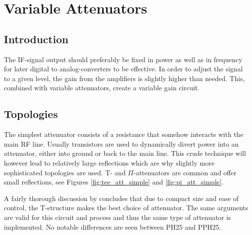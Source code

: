 \chapter{Variable Attenuators}\label{ch:vargain}
	\section{Introduction}

		The IF-signal output should preferably be fixed in power as well as in frequency for later digital to analog-converters to be effective. In order to adjust the signal to a given level, the gain from the amplifiers is slightly higher than needed. This, combined with variable attenuators, create a variable gain circuit.

	


	\section{Topologies}
		
		The simplest attenuator consists of a resistance that somehow interacts with the main RF line. Usually transistors are used to dynamically divert power into an attenuator, either into ground or back to the main line. This crude technique will however lead to relatively large reflections which are why slightly more sophisticated topologies are used. T- and $\Pi$-attenuators are common and offer small reflections, see Figures \ref{fig:tee_att_simple} and \ref{fig:pi_att_simple}.


		
		A fairly thorough discussion by \citeauthor{gustavsson07} concludes that due to compact size and ease of control, the T-structure makes the best choice of attenuator.\autocite{gustavsson07} The same arguments are valid for this circuit and process and thus the same type of attenuator is implemented. No notable differences are seen between PH25 and PPH25.

